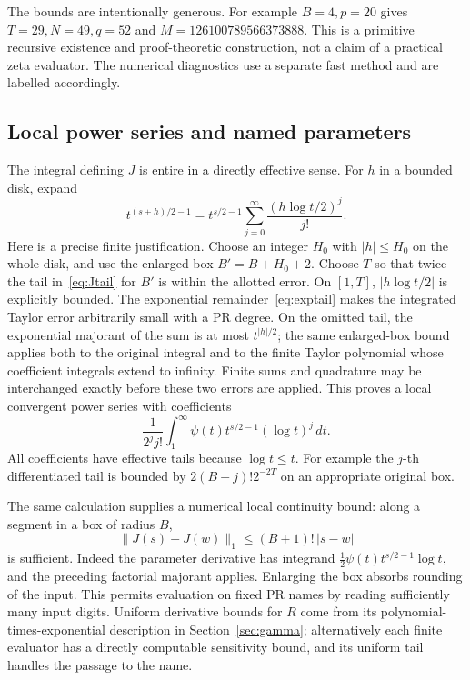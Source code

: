 \documentclass[11pt,letterpaper]{article}
\numberwithin{equation}{section}
\theoremstyle{definition}
\newcommand{\normone}[1]{\lVert #1\rVert_1}
\newcommand{\ps}{\psi}
\newcommand{\gamrec}{R}
\begin{document}
The bounds are intentionally generous. For example \(B=4,p=20\)
gives \(T=29,N=49,q=52\) and
\(M=126100789566373888\).
This is a primitive recursive existence and proof-theoretic
construction, not a claim of a practical zeta evaluator. The numerical
diagnostics use a separate fast method and are labelled accordingly.

\subsection{Local power series and named parameters}

The integral defining \(J\) is entire in a directly effective sense.
For \(h\) in a bounded disk, expand
\[
 t^{(s+h)/2-1}
       =t^{s/2-1}\sum_{j=0}^\infty
                         \frac{(h\log t/2)^j}{j!}.
\]
Here is a precise finite justification. Choose an integer \(H_0\)
with \(|h|\le H_0\) on the whole disk, and use the enlarged
box \(B'=B+H_0+2\). Choose \(T\) so that twice the
tail in~\eqref{eq:Jtail} for \(B'\) is within the allotted error.
On \([1,T]\), \(|h\log t/2|\) is explicitly bounded.
The exponential remainder~\eqref{eq:exptail} makes the integrated
Taylor error arbitrarily small with a PR degree. On the omitted
tail, the exponential majorant of the sum is at most
\(t^{|h|/2}\); the same enlarged-box bound applies both to
the original integral and to the finite Taylor polynomial whose
coefficient integrals extend to infinity.
Finite sums and quadrature may be interchanged exactly before
these two errors are applied. This proves a local convergent
power series with coefficients
\[
 \frac1{2^j j!}\int_1^\infty
          \ps(t)t^{s/2-1}(\log t)^j\,dt.
\]
All coefficients have effective tails because \(\log t\le t\).
For example the \(j\)-th differentiated tail is bounded by
\(2(B+j)!2^{-2T}\) on an appropriate original box.

The same calculation supplies a numerical local continuity bound:
along a segment in a box of radius \(B\),
\[
 \normone{J(s)-J(w)}\le (B+1)!\,|s-w|
\]
is sufficient. Indeed the parameter derivative has integrand
\(\frac12\ps(t)t^{s/2-1}\log t\), and the preceding factorial
majorant applies. Enlarging the box absorbs rounding of the input.
This permits evaluation on fixed PR names by reading sufficiently
many input digits. Uniform derivative bounds for \(\gamrec\)
come from its polynomial-times-exponential description in
Section~\ref{sec:gamma}; alternatively each finite evaluator has
a directly computable sensitivity bound, and its uniform tail
handles the passage to the name.
\end{document}
